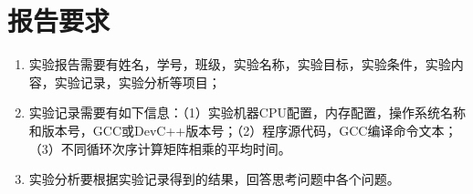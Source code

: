 \section{报告要求}

\begin{enumerate}
	\item 实验报告需要有姓名，学号，班级，实验名称，实验目标，实验条件，实验内容，实验记录，实验分析等项目；
	\item 实验记录需要有如下信息：（1）实验机器CPU配置，内存配置，操作系统名称和版本号，GCC或DevC++版本号；（2）程序源代码，GCC编译命令文本；（3）不同循环次序计算矩阵相乘的平均时间。
	\item 实验分析要根据实验记录得到的结果，回答思考问题中各个问题。
\end{enumerate}

